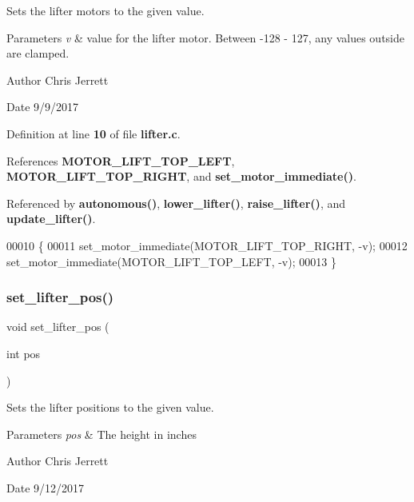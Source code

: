 Sets the lifter motors to the given value. 


\begin{DoxyParams}{Parameters}
{\em v} & value for the lifter motor. Between -\/128 -\/ 127, any values outside are clamped. \\
\hline
\end{DoxyParams}
\begin{DoxyAuthor}{Author}
Chris Jerrett 
\end{DoxyAuthor}
\begin{DoxyDate}{Date}
9/9/2017 
\end{DoxyDate}


Definition at line \textbf{ 10} of file \textbf{ lifter.\+c}.



References \textbf{ M\+O\+T\+O\+R\+\_\+\+L\+I\+F\+T\+\_\+\+T\+O\+P\+\_\+\+L\+E\+FT}, \textbf{ M\+O\+T\+O\+R\+\_\+\+L\+I\+F\+T\+\_\+\+T\+O\+P\+\_\+\+R\+I\+G\+HT}, and \textbf{ set\+\_\+motor\+\_\+immediate()}.



Referenced by \textbf{ autonomous()}, \textbf{ lower\+\_\+lifter()}, \textbf{ raise\+\_\+lifter()}, and \textbf{ update\+\_\+lifter()}.


\begin{DoxyCode}
00010                                     \{
00011   set_motor_immediate(MOTOR_LIFT_TOP_RIGHT, -v);
00012   set_motor_immediate(MOTOR_LIFT_TOP_LEFT, -v);
00013 \}
\end{DoxyCode}
\mbox{\label{lifter_8h_abddc7cb502e12fa277b627c90a45efb1}} 
\subsubsection{set\+\_\+lifter\+\_\+pos()}
{\footnotesize\ttfamily void set\+\_\+lifter\+\_\+pos (\begin{DoxyParamCaption}\item[{int}]{pos }\end{DoxyParamCaption})}



Sets the lifter positions to the given value. 


\begin{DoxyParams}{Parameters}
{\em pos} & The height in inches \\
\hline
\end{DoxyParams}
\begin{DoxyAuthor}{Author}
Chris Jerrett 
\end{DoxyAuthor}
\begin{DoxyDate}{Date}
9/12/2017 
\end{DoxyDate}


